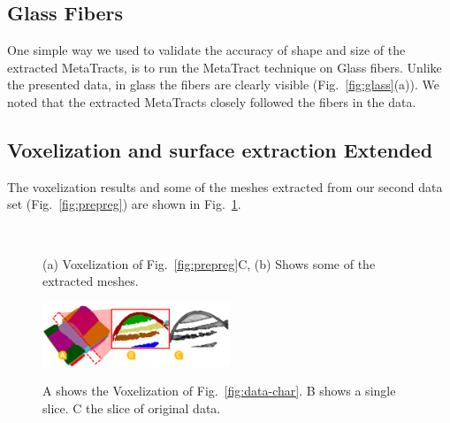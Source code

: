 \subsection{Glass Fibers}
\label{subsec:glass}
One simple way we used to validate the accuracy of shape and size of the extracted MetaTracts, is to run the MetaTract technique on Glass fibers.
Unlike the presented data, in glass the fibers are clearly visible (Fig.~\ref{fig:glass}(a)). We noted that the extracted MetaTracts closely followed the fibers in the data.
\subsection{Voxelization and surface extraction Extended}
\label{subsec:vox_ex}
The voxelization results and some of the meshes extracted from our second data set (Fig.~\ref{fig:prepreg}) are shown in Fig.~\ref{fig:vox_extended}.
\begin{figure}[h]
\centering
{}
\\
\caption{(a) Voxelization of Fig.~\ref{fig:prepreg}C, (b) Shows some of the extracted meshes.}
\label{fig:vox_extended}
\end{figure}
\begin{figure}[h]
\centering
\includegraphics[width=0.5\textwidth]{imagesMT2014/UserStudy/vol_crop16}
\\
\caption{ A shows the Voxelization of Fig.~\ref{fig:data-char}. B shows a single slice. C the slice of original data. }
\label{fig:vox_extended_crop16}
\end{figure}

